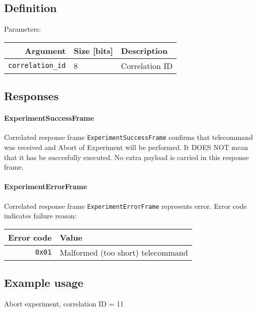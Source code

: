\subsection{Definition}

Parameters: 

\begin{tabular}{r | l | l}
	Argument                    & Size [bits] & Description \\
	\hline
	\texttt{correlation\_id}    & 8 		  &	Correlation ID \\
\end{tabular}

\subsection{Responses}

\paragraph{ExperimentSuccessFrame}
Correlated response frame \texttt{ExperimentSuccessFrame} confirms that telecommand was received and Abort of Experiment will be performed. It DOES NOT mean that it has be succesfully executed.
No extra payload is carried in this response frame.

\paragraph{ExperimentErrorFrame}
Correlated response frame \texttt{ExperimentErrorFrame} represents error. Error code indicates failure reason:

\begin{tabular}{r | l}
	Error code & Value \\
	\hline
	\texttt{0x01} & Malformed (too short) telecommand \\
	
\end{tabular}

\subsection{Example usage}
Abort experiment, correlation ID = 11
